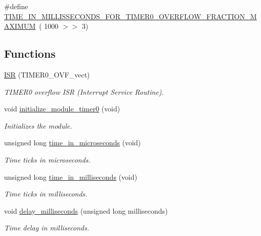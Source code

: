 \begin{DoxyCompactItemize}
\item 
\#define \hyperlink{group__custom__timer_ga2322cd9c5ca701585ac9c61123216a67}{T\+I\+M\+E\+\_\+\+I\+N\+\_\+\+M\+I\+L\+L\+I\+S\+S\+E\+C\+O\+N\+D\+S\+\_\+\+F\+O\+R\+\_\+\+T\+I\+M\+E\+R0\+\_\+\+O\+V\+E\+R\+F\+L\+O\+W\+\_\+\+F\+R\+A\+C\+T\+I\+O\+N\+\_\+\+M\+A\+X\+I\+M\+UM}~( 1000 $>$$>$ 3)
\end{DoxyCompactItemize}
\subsection*{Functions}
\begin{DoxyCompactItemize}
\item 
\hyperlink{group__custom__timer_gadd2d7cdddfb682dcc0391e60cf42c7d6}{I\+SR} (T\+I\+M\+E\+R0\+\_\+\+O\+V\+F\+\_\+vect)
\begin{DoxyCompactList}\small\item\em T\+I\+M\+E\+R0 overflow I\+SR (Interrupt Service Routine). \end{DoxyCompactList}\item 
void \hyperlink{group__custom__timer_gac2aeae62e4b8528ccd841f63f83a49b4}{initialize\+\_\+module\+\_\+timer0} (void)
\begin{DoxyCompactList}\small\item\em Initializes the module. \end{DoxyCompactList}\item 
unsigned long \hyperlink{group__custom__timer_gada8ec2a9d8790c2818e0094855ecdb7e}{time\+\_\+in\+\_\+microseconds} (void)
\begin{DoxyCompactList}\small\item\em Time ticks in microseconds. \end{DoxyCompactList}\item 
unsigned long \hyperlink{group__custom__timer_gae3c70f50721e84e6761da58ff419f865}{time\+\_\+in\+\_\+milliseconds} (void)
\begin{DoxyCompactList}\small\item\em Time ticks in milliseconds. \end{DoxyCompactList}\item 
void \hyperlink{group__custom__timer_gaa10b6cff287b214da3fe126055ba32a3}{delay\+\_\+milliseconds} (unsigned long milliseconds)
\begin{DoxyCompactList}\small\item\em Time delay in milliseconds. \end{DoxyCompactList}\end{DoxyCompactItemize}


